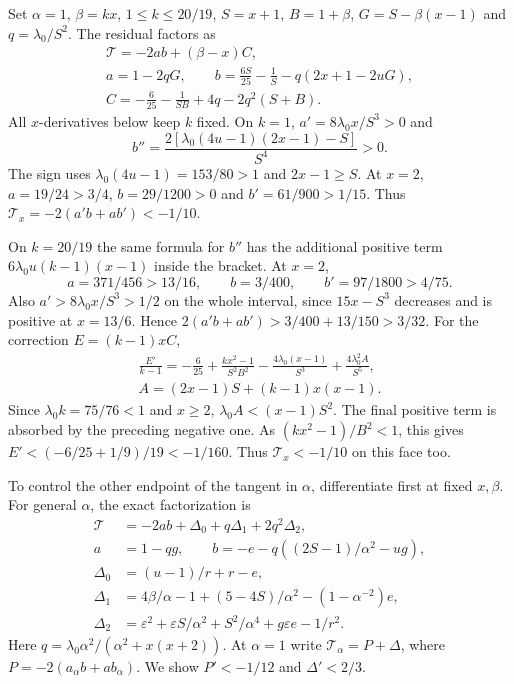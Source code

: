  Set $\alpha=1$, $\beta=kx$,
$1\le k\le20/19$, $S=x+1$, $B=1+\beta$, $G=S-\beta(x-1)$ and $q=\lambda_0/S^2$.
The residual factors as
\begin{gather*}
 \mathcal T=-2ab+(\beta-x)C,\\
 a=1-2qG,\qquad b=\frac{6S}{25}-\frac1S-q(2x+1-2uG),\\
 C=-\frac6{25}-\frac1{SB}+4q-2q^2(S+B).
\end{gather*}
All $x$-derivatives below keep $k$ fixed.
On $k=1$, $a'=8\lambda_0x/S^3>0$ and
\[
 b''=\frac{2[\lambda_0(4u-1)(2x-1)-S]}{S^4}>0.
\]
The sign uses $\lambda_0(4u-1)=153/80>1$ and $2x-1\ge S$.
At $x=2$, $a=19/24>3/4$, $b=29/1200>0$ and $b'=61/900>1/15$.
Thus $\mathcal T_x=-2(a'b+ab')<-1/10$.

On $k=20/19$ the same formula for $b''$ has the additional positive term
$6\lambda_0u(k-1)(x-1)$ inside the bracket. At $x=2$,
\[
 a=371/456>13/16,\qquad b=3/400,\qquad b'=97/1800>4/75.
\]
Also $a'>8\lambda_0x/S^3>1/2$ on the whole interval, since
$15x-S^3$ decreases and is positive at $x=13/6$.
Hence $2(a'b+ab')>3/400+13/150>3/32$.
For the correction $E=(k-1)xC$,
\begin{gather*}
 \frac{E'}{k-1}=-\frac6{25}+\frac{kx^2-1}{S^2B^2}
       -\frac{4\lambda_0(x-1)}{S^3}+\frac{4\lambda_0^2A}{S^5},\\
 A=(2x-1)S+(k-1)x(x-1).
\end{gather*}
Since $\lambda_0 k=75/76<1$ and $x\ge2$, $\lambda_0A<(x-1)S^2$.
The final positive term is absorbed by the preceding negative one.
As $(kx^2-1)/B^2<1$, this gives
$E'<(-6/25+1/9)/19<-1/160$. Thus $\mathcal T_x<-1/10$ on this face too.

To control the other endpoint of the tangent in $\alpha$, differentiate first at fixed
$x,\beta$. For general $\alpha$, the exact factorization is
\begin{align*}
 \mathcal T&=-2ab+\Delta_0+q\Delta_1+2q^2\Delta_2,\\
 a&=1-qg,\qquad b=-e-q((2S-1)/\alpha^2-ug),\\
 \Delta_0&=(u-1)/r+r-e,\\
 \Delta_1&=4\beta/\alpha-1+(5-4S)/\alpha^2-(1-\alpha^{-2})e,\\
 \Delta_2&=\varepsilon^2+\varepsilon S/\alpha^2+S^2/\alpha^4
                       +g\varepsilon e-1/r^2.
\end{align*}
Here $q=\lambda_0\alpha^2/(\alpha^2+x(x+2))$.
At $\alpha=1$ write $\mathcal T_\alpha=P+\Delta$, where
$P=-2(a_\alpha b+ab_\alpha)$. We show $P'<-1/12$ and $\Delta'<2/3$.

